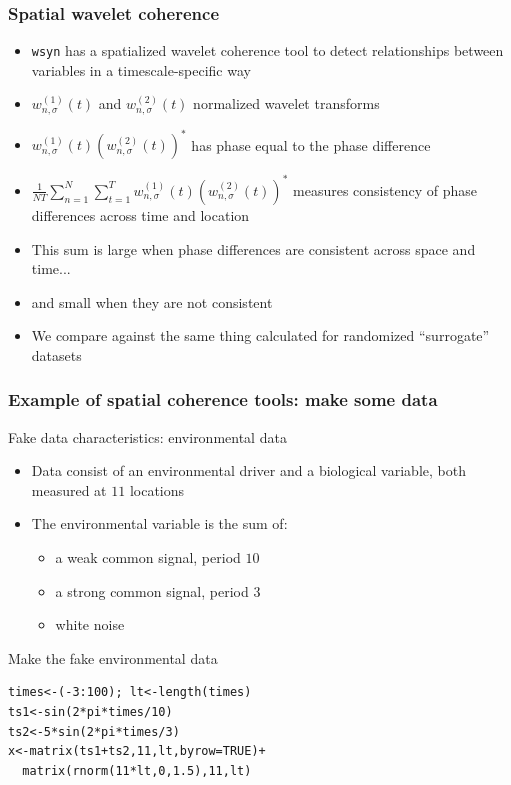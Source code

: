\documentclass{beamer}
\begin{document}
\begin{frame}
\frametitle{Spatial wavelet coherence}
\begin{itemize}
\item \texttt{wsyn} has a spatialized wavelet coherence tool to detect relationships between variables in a timescale-specific way
\item $w_{n,\sigma}^{(1)}(t)$ and $w_{n,\sigma}^{(2)}(t)$ normalized wavelet transforms
\item $w_{n,\sigma}^{(1)}(t) (w_{n,\sigma}^{(2)}(t))^{*}$ has phase equal to the phase difference
\item $\frac{1 }{NT}\sum_{n= 1}^{N}\sum_{t=1}^{T} w_{n,\sigma}^{(1)}(t) (w_{n,\sigma}^{(2)}(t))^{*}$ measures consistency of phase differences across time and location 
\item This sum is large when phase differences are consistent across space and time...
\item and small when they are not consistent
\item We compare against the same thing calculated for randomized ``surrogate'' datasets
\end{itemize}
\end{frame}

\begin{frame}[fragile]
\frametitle{Example of spatial coherence tools: make some data}
\begin{block}{Fake data characteristics: environmental data}
\begin{itemize}
\item Data consist of an environmental driver and a biological variable, both measured at $11$ locations
\item The environmental variable is the sum of:
\begin{itemize}
\item a weak common signal, period $10$
\item a strong common signal, period $3$
\item white noise 
\end{itemize}
\end{itemize}
\end{block}
\begin{exampleblock}{Make the fake environmental data}
\begin{verbatim}
times<-(-3:100); lt<-length(times)
ts1<-sin(2*pi*times/10)
ts2<-5*sin(2*pi*times/3)
x<-matrix(ts1+ts2,11,lt,byrow=TRUE)+
  matrix(rnorm(11*lt,0,1.5),11,lt)
\end{verbatim}
\end{exampleblock}
\end{frame}
\end{document}
